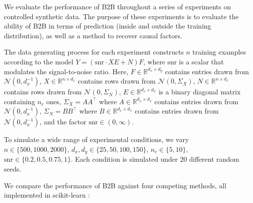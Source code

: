 We evaluate the performance of B2B throughout a series of experiments on controlled synthetic data.
%
The purpose of these experiments is to evaluate the ability of B2B in terms of prediction (inside and outside the training distribution), as well as a method to recover causal factors.

The data generating process for each experiment constructs $n$ training examples according to the model $Y = (\text{snr} \cdot XE + N)F$, where $\text{snr}$ is a scalar that modulates the signal-to-noise ratio.
%
Here,
    $F \in \mathbb{R}^{d_x \times d_y}$ contains entries drawn from $\mathcal{N}(0, d_x^{-1})$,
    $X \in \mathbb{R}^{n \times d_x}$ contains rows drawn from $\mathcal{N}(0, \Sigma_X)$,
    $N \in \mathbb{R}^{n \times d_x}$ contains rows drawn from $\mathcal{N}(0, \Sigma_N)$,
    $E \in \mathbb{R}^{d_x \times d_x}$ is a binary diagonal matrix containing $n_c$ ones,
    $\Sigma_X = AA^\top$ where $A \in \mathbb{R}^{d_x \times d_x}$ contains entries drawn from $\mathcal{N}(0, d_x^{-1})$,
    $\Sigma_N = BB^\top$ where $B \in \mathbb{R}^{d_x \times d_x}$ contains entries drawn from $\mathcal{N}(0, d_x^{-1})$,
and the factor $\text{snr} \in (0, \infty)$.

To simulate a wide range of experimental conditions, we vary $n \in \{500, 1000, 2000\}$, $d_x, d_y \in \{ 25, 50, 100, 150 \}$, $n_c \in \{ 5, 10 \}$, $\text{snr} \in \{ 0.2, 0.5, 0.75, 1 \}$.
%
Each condition is simulated under $20$ different random seeds.

We compare the performance of B2B against four competing methods, all implemented in scikit-learn \citep{scikit}:
%

